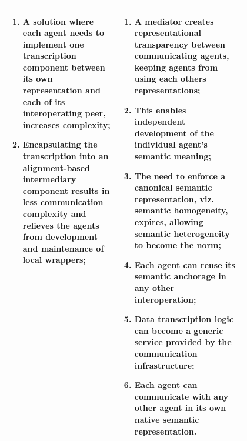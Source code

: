 \begin{xltabular}[l]{\linewidth}{@{} >{\small\raggedright\arraybackslash}p{0.47\linewidth} >{\small\raggedright\arraybackslash}X @{}}
\begin{enumerate}[left=6pt, nosep]
  \item A solution where each agent needs to implement one transcription component between its own representation and each of its interoperating peer, increases complexity;
  \item Encapsulating the transcription into an alignment-based intermediary component results in less communication complexity and relieves the agents from development and maintenance of local wrappers;
\end{enumerate}
&
\begin{enumerate}[left=10pt, nosep]
  \item A mediator creates representational transparency between communicating agents, keeping agents from using each others representations;
  \item This enables independent development of the individual agent’s semantic meaning;
  \item The need to enforce a canonical semantic representation, viz. semantic homogeneity, expires, allowing semantic heterogeneity to become the norm;
  \item Each agent can reuse its semantic anchorage in any other interoperation;
  \item Data transcription logic can become a generic service provided by the communication infrastructure;
  \item Each agent can communicate with any other agent in its own native semantic representation.
\end{enumerate}\\
%
\bottomrule
\end{xltabular}
